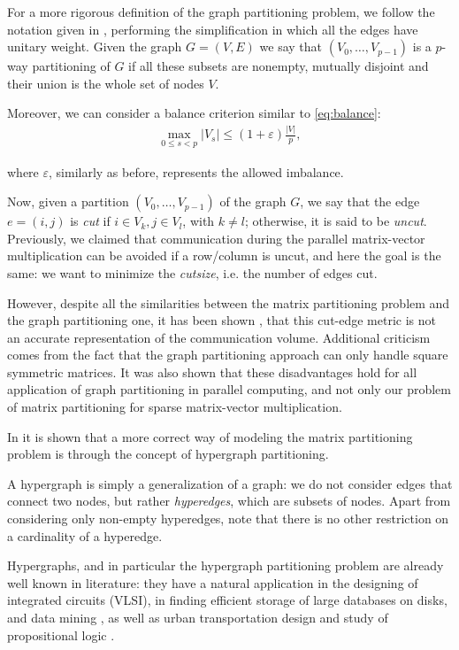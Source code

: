 For a more rigorous definition of the graph partitioning problem, we follow the notation given in \cite{hypergraph_model},  performing the simplification in which all the edges have unitary weight. Given the graph $G=(V,E)$ we say that $(V_0,\dots,V_{p-1})$ is a $p$-way partitioning of $G$ if all these subsets are nonempty, mutually disjoint and their union is the whole set of nodes $V$. 

Moreover, we can consider a balance criterion similar to \eqref{eq:balance}:
\begin{align}
	\max_{0\leq s <p}	|V_s| \leq (1+\varepsilon)\frac{|V|}{p},
	\label{eq:balance_hypergraph}
\end{align}

where $\varepsilon$, similarly as before, represents the allowed imbalance.

Now, given a partition $(V_0,\dots,V_{p-1})$ of the graph $G$, we say that the edge $e=(i,j)$ is \emph{cut} if $i \in V_k, j \in V_l$, with $k \neq l$; otherwise, it is said to be \emph{uncut}. Previously, we claimed that communication during the parallel matrix-vector multiplication can be avoided if a row/column is uncut, and here the goal is the same: we want to minimize the \emph{cutsize}, i.e. the number of edges cut.

However, despite all the similarities between the matrix partitioning problem and the graph partitioning one, it has been shown \cite{hypergraph_model}\cite{zoltan_worth-it},  that this cut-edge metric is not an accurate representation of the communication volume. Additional criticism \cite{hendrickson_emperor} comes from the fact that the graph partitioning approach can only handle square symmetric matrices. It was also shown \cite{hendrickson_kolda} that these disadvantages hold for all application of graph partitioning in parallel computing, and not only our problem of matrix partitioning for sparse matrix-vector multiplication. 

In \cite{hypergraph_model} it is shown that a more correct way of modeling the matrix partitioning problem is through the concept of hypergraph partitioning.

A hypergraph is simply a generalization of a graph: we do not consider edges that connect two nodes, but rather \emph{hyperedges}, which are subsets of nodes. Apart from considering only non-empty hyperedges, note that there is no other restriction on a cardinality of a hyperedge.

Hypergraphs, and in particular the hypergraph partitioning problem are already well known in literature: they have a natural application in the designing of integrated circuits (VLSI), in finding efficient storage of large databases on disks, and data mining \cite{vlsi}, as well as urban transportation design and study of propositional logic \cite{papa_hypergraph}.

